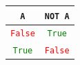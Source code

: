 \documentclass[border=10pt]{standalone}
\newcommand{\firatt}[1]{\texttt{#1}}
\newcommand{\firatrue}{\textcolor{green}{\firatt{True}}}
\newcommand{\firafalse}{\textcolor{red}{\firatt{False}}}
\begin{document}
\begin{tabular}{c|c}
\firatt{A} & \firatt{NOT A} \\
\hline
\firafalse & \firatrue \\
\firatrue & \firafalse \\
\end{tabular}
\end{document}
